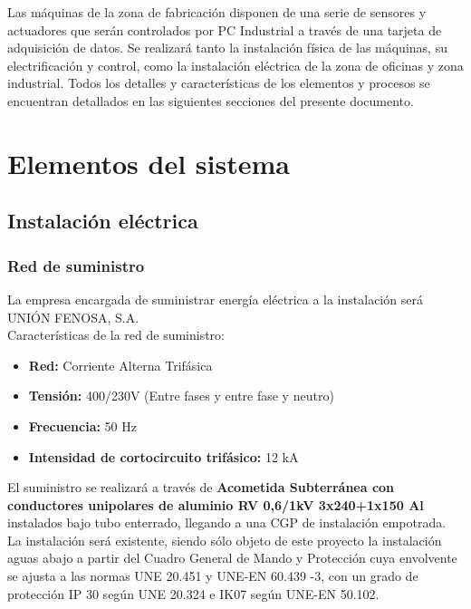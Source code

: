 Las máquinas de la zona de fabricación disponen de una serie de sensores y actuadores que serán controlados por PC Industrial a través de una tarjeta de adquisición de datos. Se realizará tanto la instalación física de las máquinas, su electrificación y control, como la instalación eléctrica de la zona de oficinas y zona industrial. Todos los detalles y características de los elementos y procesos se encuentran detallados en las siguientes secciones del presente documento.

\section{Elementos del sistema}

\subsection{Instalación eléctrica}

\subsubsection{Red de suministro}

La empresa encargada de suministrar energía eléctrica a la instalación será UNIÓN FENOSA, S.A.\\

Características de la red de suministro:\

\begin{itemize}
\item {\bfseries Red:} Corriente Alterna Trifásica 
\item {\bfseries Tensión:} 400/230V (Entre fases y entre fase y neutro)
\item {\bfseries Frecuencia:} 50 Hz
\item {\bfseries Intensidad de cortocircuito trifásico:} 12 kA
\end{itemize}

El suministro se realizará a través de {\bfseries Acometida Subterránea con conductores unipolares de aluminio RV 0,6/1kV 3x240+1x150 Al} instalados bajo tubo enterrado, llegando a una CGP de instalación empotrada. La instalación será existente, siendo sólo objeto de este proyecto la instalación aguas abajo a partir del Cuadro General de Mando y Protección cuya envolvente se ajusta a las normas UNE 20.451 y UNE-EN 60.439 -3, con un grado de protección IP 30 según UNE 20.324 e IK07 según UNE-EN 50.102.\\

